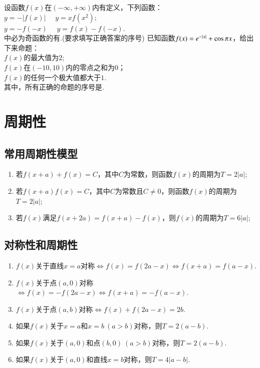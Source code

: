 \documentclass{BHCexam}
\begin{document}
\begin{questions}
\qs 设函数$f(x)$在$ \left(-\infty,+\infty\right) $内有定义，下列函数：\\
 $ y=-\left|f(x)\right| $\ \  $ y=xf(x^2) $;\\
 $ y=-f(-x) $\ \  $ y=f(x)-f(-x) $.\\
中必为奇函数的有\tk.(要求填写正确答案的序号)
\qs 已知函数$f(x)=e^{-\left|x\right|}+\cos \pi x$，给出下来命题：\\
 $f(x)$的最大值为$2$;\\
 $f(x)$在$ \left(-10,10\right) $内的零点之和为$ 0 $；\\
 $f(x)$的任何一个极大值都大于$ 1 $.\\
其中，所有正确的命题的序号是\tk.
\end{questions}
\newpage


\section{周期性}
\subsection{常用周期性模型}
\begin{enumerate}[1)]
\item 若$ f(x+a)+f(x)=C $，其中$ C $为常数，则函数$f(x)$的周期为$ T=2\left|a\right|$;
\item 若$ f(x+a)f(x)=C $，其中$ C $为常数且$ C\ne 0 $，则函数$f(x)$的周期为$ T=2\left|a\right|$;
\item 若$f(x)$满足$ f(x+2a)=f(x+a)-f(x) $，则$f(x)$的周期为$ T=6\left|a\right| $;
\end{enumerate}
\subsection{对称性和周期性}
\begin{enumerate}[1)]
\item $f(x)$关于直线$ x=a $对称$ \Leftrightarrow f(x)=f(2a-x)\Leftrightarrow f(x+a)=f(a-x) $.
\item $f(x)$关于点$ (a,0) $对称$ \Leftrightarrow f(x)=-f(2a-x)\Leftrightarrow f(x+a)=-f(a-x) $.
\item $f(x)$关于点$ (a,b) $对称$ \Leftrightarrow f(x)+f(2a-x)=2b$.
\item 如果$f(x)$关于$ x=a $和$ x=b ~(a>b)$对称，则$ T=2(a-b) .$
\item 如果$f(x)$关于$ (a,0) $和点$ (b,0)~ (a>b)$对称，则$ T=2(a-b) .$
\item 如果$f(x)$关于$ (a,0) $和直线$ x=b$对称，则$ T=4\left|a-b\right| .$
\end{enumerate}
\end{document}
